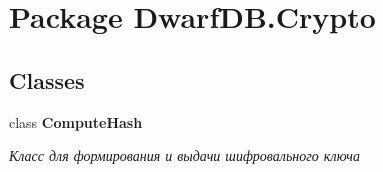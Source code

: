 \hypertarget{namespace_dwarf_d_b_1_1_crypto}{\section{Package Dwarf\+D\+B.\+Crypto}
\label{namespace_dwarf_d_b_1_1_crypto}
}
\subsection*{Classes}
\begin{DoxyCompactItemize}
\item 
class {\bfseries Compute\+Hash}
\begin{DoxyCompactList}\small\item\em Класс для формирования и выдачи шифровального ключа \end{DoxyCompactList}\end{DoxyCompactItemize}
